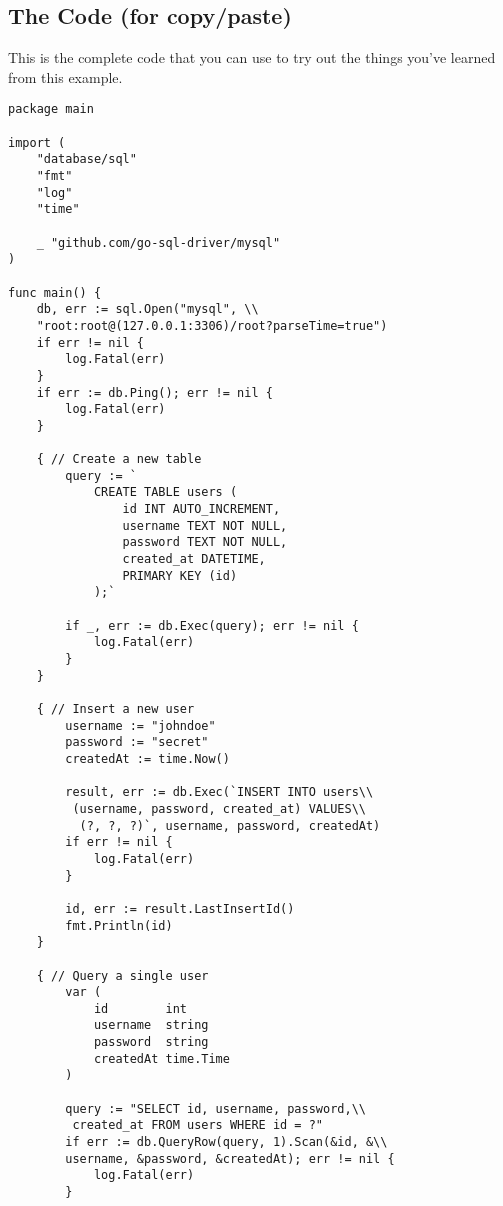 \subsection{The Code (for copy/paste)}

This is the complete code that you can use to try out the things you’ve learned from this example.


\begin{lstlisting}[numbers=none]
package main

import (
    "database/sql"
    "fmt"
    "log"
    "time"

    _ "github.com/go-sql-driver/mysql"
)

func main() {
    db, err := sql.Open("mysql", \\
    "root:root@(127.0.0.1:3306)/root?parseTime=true")
    if err != nil {
        log.Fatal(err)
    }
    if err := db.Ping(); err != nil {
        log.Fatal(err)
    }

    { // Create a new table
        query := `
            CREATE TABLE users (
                id INT AUTO_INCREMENT,
                username TEXT NOT NULL,
                password TEXT NOT NULL,
                created_at DATETIME,
                PRIMARY KEY (id)
            );`

        if _, err := db.Exec(query); err != nil {
            log.Fatal(err)
        }
    }

    { // Insert a new user
        username := "johndoe"
        password := "secret"
        createdAt := time.Now()

        result, err := db.Exec(`INSERT INTO users\\
         (username, password, created_at) VALUES\\
          (?, ?, ?)`, username, password, createdAt)
        if err != nil {
            log.Fatal(err)
        }

        id, err := result.LastInsertId()
        fmt.Println(id)
    }

    { // Query a single user
        var (
            id        int
            username  string
            password  string
            createdAt time.Time
        )

        query := "SELECT id, username, password,\\
         created_at FROM users WHERE id = ?"
        if err := db.QueryRow(query, 1).Scan(&id, &\\
        username, &password, &createdAt); err != nil {
            log.Fatal(err)
        }


\end{lstlisting}
